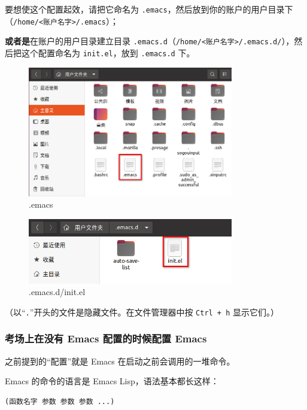 \documentclass[UTF-8]{ctexart}
\begin{document}
				要想使这个配置起效，请把它命名为 \texttt{.emacs}，然后放到你的账户的用户目录下（\texttt{/home/<账户名字>/.emacs}）；
				
				\textbf{或者是}在账户的用户目录建立目录 \texttt{.emacs.d}（\texttt{/home/<账户名字>/.emacs.d/}），然后把这个配置命名为 \texttt{init.el}，放到 \texttt{.emacs.d} 下。
				
				\begin{figure}[H]
					\centering
					\includegraphics[width=0.8\textwidth]{fig/place_emacs.png}
					\caption*{.emacs}
				\end{figure}
			
				\begin{figure}[H]
					\centering
					\includegraphics[width=0.8\textwidth]{fig/place_init_el.png}
					\caption*{.emacs.d/init.el}
				\end{figure}
				
				（以“\texttt{.}”开头的文件是隐藏文件。在文件管理器中按 \texttt{Ctrl + h} 显示它们。）
			
			\subsubsection{考场上在没有 Emacs 配置的时候配置 Emacs}
			
				之前提到的“配置”就是 Emacs 在启动之前会调用的一堆命令。
				
				Emacs 的命令的语言是 Emacs Lisp，语法基本都长这样：
				
				\begin{verbatim}
(函数名字 参数 参数 参数 ...)
				\end{verbatim}
			
\end{document}
